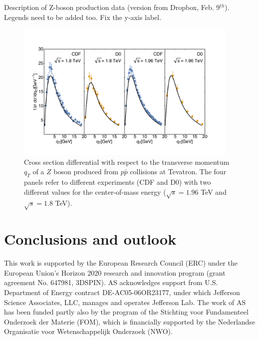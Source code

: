 \documentclass[aps,preprintnumbers,showpacs,nofootinbib,superscriptaddress,floatfix]{revtex4}
\begin{document}
Description of Z-boson production data (version from Dropbox, Feb. 9$^{th}$).
Legends need to be added too. Fix the y-axis label.
\begin{figure}[h!]
\begin{center}
\includegraphics[width=0.95\textwidth]{plots/Z_SCIplot_flINDEP.pdf}
\end{center}
\caption{Cross section differential with respect to the transverse momentum $q_T$ of a $Z$ boson produced from $p\bar{p}$ collisions at Tevatron. The four panels refer to different experiments (CDF and D$0$) with two different values for the center-of-mass energy ($\sqrt{s} = 1.96$ TeV and $\sqrt{s}=1.8$ TeV).} 
\label{f:Z_qT}
\end{figure}











\section{Conclusions and outlook}
\label{s:end}



\newpage
\begin{acknowledgments}
This work is supported by the European Research Council (ERC) under the European Union's Horizon 2020 research and innovation program (grant agreement No. 647981, 3DSPIN). 
AS acknowledges support from U.S. Department of Energy contract DE-AC05-06OR23177, under which Jefferson Science Associates, LLC, manages and operates Jefferson Lab. 
The work of AS has been funded partly also by the program of the Stichting voor Fundamenteel Onderzoek der Materie (FOM), which is financially supported by the Nederlandse Organisatie voor Wetenschappelijk Onderzoek (NWO).
\end{acknowledgments}
%
%

%

%
%
\end{document}
